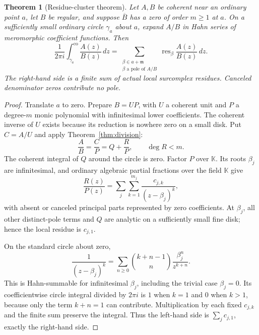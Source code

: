 \documentclass[11pt,a4paper]{article}
\numberwithin{equation}{section}
\newtheorem{theorem}{Theorem}[section]
\theoremstyle{definition}
\theoremstyle{remark}
\newcommand{\K}{\mathbb K}
\newcommand{\mm}{\mathfrak m}
\newcommand{\res}{\operatorname{res}}
\newcommand{\co}{\mathrm{co}}
\begin{document}
\begin{theorem}[Residue-cluster theorem]
\label{thm:rescluster}
Let $A,B$ be coherent near an ordinary point $a$, let $B$ be regular, and suppose $\overline B$ has a zero of order $m\geq1$ at $a$. On a sufficiently small ordinary circle $\gamma_a$ about $a$, expand $A/B$ in Hahn series of meromorphic coefficient functions. Then
\begin{equation}
\label{eq:clusterres}
 \frac1{2\pi i}\int_{\gamma_a}^{\co}\frac{A(z)}{B(z)}\,dz
 =\sum_{\substack{\beta\in a+\mm\\\beta\text{ a pole of }A/B}}
   \res_\beta\frac{A(z)}{B(z)}\,dz.
\end{equation}
The right-hand side is a finite sum of actual local surcomplex residues. Canceled denominator zeros contribute no pole.
\end{theorem}
\begin{proof}
Translate $a$ to zero. Prepare $B=UP$, with $U$ a coherent unit and $P$ a degree-$m$ monic polynomial with infinitesimal lower coefficients. The coherent inverse of $U$ exists because its reduction is nowhere zero on a small disk. Put $C=A/U$ and apply Theorem~\ref{thm:division}:
\[
 \frac AB=\frac CP=Q+\frac RP,\qquad \deg R<m.
\]
The coherent integral of $Q$ around the circle is zero. Factor $P$ over $\K$. Its roots $\beta_j$ are infinitesimal, and ordinary algebraic partial fractions over the field $\K$ give
\[
 \frac{R(z)}{P(z)}
 =\sum_j\sum_{k=1}^{m_j}\frac{c_{j,k}}{(z-\beta_j)^k},
\]
with absent or canceled principal parts represented by zero coefficients. At $\beta_j$, all other distinct-pole terms and $Q$ are analytic on a sufficiently small fine disk; hence the local residue is $c_{j,1}$.

On the standard circle about zero,
\[
 \frac1{(z-\beta_j)^k}
 =\sum_{n\geq0}\binom{k+n-1}{n}\frac{\beta_j^n}{z^{k+n}}.
\]
This is Hahn-summable for infinitesimal $\beta_j$, including the trivial case $\beta_j=0$. Its coefficientwise circle integral divided by $2\pi i$ is $1$ when $k=1$ and $0$ when $k>1$, because only the term $k+n=1$ can contribute. Multiplication by each fixed $c_{j,k}$ and the finite sum preserve the integral. Thus the left-hand side is $\sum_jc_{j,1}$, exactly the right-hand side.
\end{proof}
\end{document}
